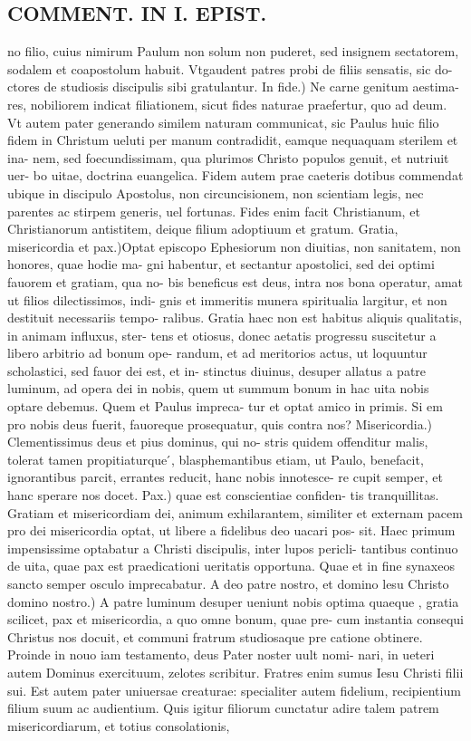 \documentclass{article}
\begin{document}
\begin{pages}
\section*{COMMENT. IN I. EPIST. }
\marginpar{[ p.466 ]}\pstart no filio, cuius nimirum Paulum non solum non puderet, sed insignem sectatorem, sodalem et coapostolum habuit. Vtgaudent patres probi de filiis sensatis, sic do- ctores de studiosis discipulis sibi gratulantur. In fide.) Ne carne genitum aestima- res, nobiliorem indicat filiationem, sicut fides naturae praefertur, quo ad deum. Vt autem pater generando similem naturam communicat, sic Paulus huic filio fidem in Christum ueluti per manum contradidit, eamque nequaquam sterilem et ina- nem, sed foecundissimam, qua plurimos Christo populos genuit, et nutriuit uer- bo uitae, doctrina euangelica. Fidem autem prae caeteris dotibus commendat ubique  in discipulo Apostolus, non circuncisionem, non scientiam legis, nec parentes ac stirpem generis, uel fortunas. Fides enim facit Christianum, et Christianorum antistitem, deique filium adoptiuum et gratum. Gratia, misericordia et pax.)Optat episcopo Ephesiorum non diuitias, non sanitatem, non honores, quae hodie ma- gni habentur, et sectantur apostolici, sed dei optimi fauorem et gratiam, qua no- bis beneficus est deus, intra nos bona operatur, amat ut filios dilectissimos, indi- gnis et immeritis munera spiritualia largitur, et non destituit necessariis tempo- ralibus. Gratia haec non est habitus aliquis qualitatis, in animam influxus, ster- tens et otiosus, donec aetatis progressu suscitetur a libero arbitrio ad bonum ope- randum, et ad meritorios actus, ut loquuntur scholastici, sed fauor dei est, et in- stinctus diuinus, desuper allatus a patre luminum, ad opera dei in nobis, quem ut summum bonum in hac uita nobis optare debemus. Quem et Paulus impreca- tur et optat amico in primis. Si em pro nobis deus fuerit, fauoreque prosequatur, quis contra nos? Misericordia.) Clementissimus deus et pius dominus, qui no- stris quidem offenditur malis, tolerat tamen propitiaturque ́, blasphemantibus etiam, ut Paulo, benefacit, ignorantibus parcit, errantes reducit, hanc nobis innotesce- re cupit semper, et hanc sperare nos docet. Pax.) quae est conscientiae confiden- tis tranquillitas. Gratiam et misericordiam dei, animum exhilarantem, similiter et externam pacem pro dei misericordia optat, ut libere a fidelibus deo uacari pos- sit. Haec primum impensissime optabatur a Christi discipulis, inter lupos pericli- tantibus continuo de uita, quae pax est praedicationi ueritatis opportuna. Quae et in fine synaxeos sancto semper osculo imprecabatur. A deo patre nostro, et domino lesu Christo domino nostro.) A patre luminum desuper ueniunt nobis optima quaeque , gratia scilicet, pax et misericordia, a quo omne bonum, quae pre- cum instantia consequi Christus nos docuit, et communi fratrum studiosaque pre catione obtinere. Proinde in nouo iam testamento, deus Pater noster uult nomi- nari, in ueteri autem Dominus exercituum, zelotes scribitur. Fratres enim sumus Iesu Christi filii sui. Est autem pater uniuersae creaturae: specialiter autem fidelium, recipientium filium suum ac audientium. Quis igitur filiorum cunctatur adire talem patrem misericordiarum, et totius consolationis, 
\end{pages}
\end{document}
